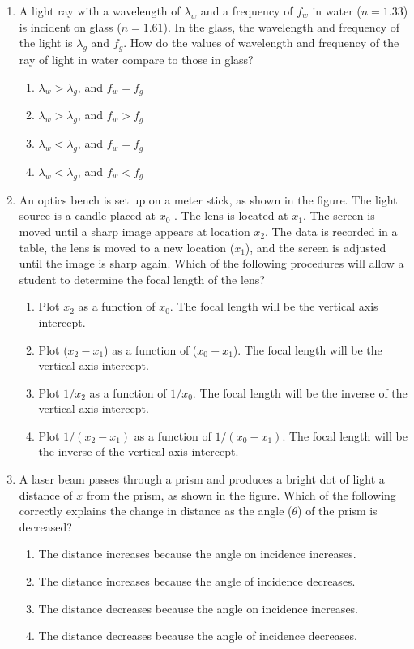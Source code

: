 \documentclass{../../../oss-apphys}
\begin{document}
\begin{multicols*}{2}
\begin{enumerate}[leftmargin=18pt]
  \item A light ray with a wavelength of $\lambda_w$ and a frequency of
    $f_w$ in water ($n=1.33$) is incident on glass ($n=1.61$). In the glass,
    the wavelength and frequency of the light is $\lambda_g$ and $f_g$. How do
    the values of wavelength and frequency of the ray of light in water compare
    to those in glass?
    \begin{enumerate}[nosep,leftmargin=18pt,label=(\Alph*)]
    \item $\lambda_w>\lambda_g$, and $f_w=f_g$
    \item $\lambda_w>\lambda_g$, and $f_w>f_g$
    \item $\lambda_w<\lambda_g$, and $f_w=f_g$
    \item $\lambda_w<\lambda_g$, and $f_w<f_g$
    \end{enumerate}

  \item An optics bench is set up on a meter stick, as shown in the figure. The
    light source is a candle placed at $x_0$ . The lens is located at $x_1$. The
    screen is moved until a sharp image appears at location $x_2$. The data is
    recorded in a table, the lens is moved to a new location ($x_1$), and the
    screen is adjusted until the image is sharp again. Which of the
    following procedures will allow a student to determine the focal length
    of the lens?
    \begin{enumerate}[nosep,leftmargin=18pt,label=(\Alph*)]
    \item Plot $x_2$ as a function of $x_0$. The focal length will be the
      vertical axis intercept.
    \item Plot ($x_2-x_1$) as a function of ($x_0-x_1$). The focal length will
      be the vertical axis intercept.
    \item Plot $1/x_2$ as a function of $1/x_0$. The focal length will be the
      inverse of the vertical axis intercept.
    \item Plot $1/(x_2-x_1)$ as a function of $1/(x_0-x_1)$. The focal length
      will be the inverse of the vertical axis intercept.
    \end{enumerate}

  \item A laser beam passes through a prism and produces a bright dot of light
    a distance of $x$ from the prism, as shown in the figure. Which of the
    following correctly explains the change in distance as the angle
    ($\theta$) of the prism is decreased?
    \begin{enumerate}[nosep,leftmargin=18pt,label=(\Alph*)]
    \item The distance increases because the angle on incidence increases.
    \item The distance increases because the angle of incidence decreases.
    \item The distance decreases because the angle on incidence increases.
    \item The distance decreases because the angle of incidence decreases.
    \end{enumerate}


\end{enumerate}
\end{multicols*}
\end{document}
